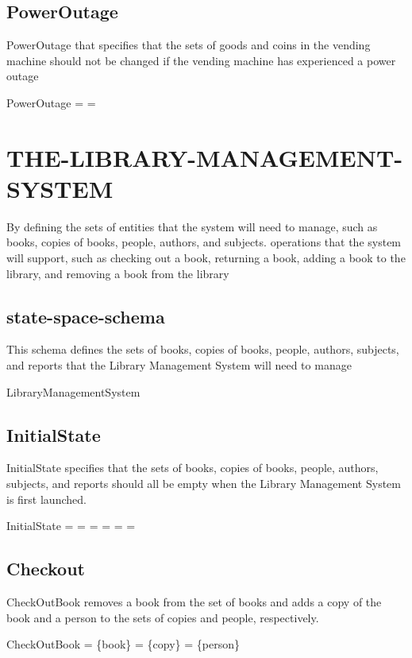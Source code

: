 \documentclass{article}
\begin{document}
\subsection{PowerOutage}
 PowerOutage that specifies that the sets of goods and coins in the vending machine should not be changed if the vending machine has experienced a power outage
\begin{schema}{PowerOutage}
 = 
 = 
\end{schema}

\section{THE-LIBRARY-MANAGEMENT-SYSTEM}
By defining the sets of entities that the system will need to manage, such as books, copies of books, people, authors, and subjects. operations that the system will support, such as checking out a book, returning a book, adding a book to the library, and removing a book from the library

\subsection{state-space-schema}
This schema defines the sets of books, copies of books, people, authors, subjects, and reports that the Library Management System will need to manage
\begin{schema}{LibraryManagementSystem}
\end{schema}

\subsection{InitialState}
InitialState specifies that the sets of books, copies of books, people, authors, subjects, and reports should all be empty when the Library Management System is first launched.
\begin{schema}{InitialState}
 = \emptyset
{} = \emptyset
{} = \emptyset
{} = \emptyset
{} = \emptyset
{} = \emptyset
\end{schema}


\subsection{Checkout}
CheckOutBook removes a book from the set of books and adds a copy of the book and a person to the sets of copies and people, respectively.
\begin{schema}{CheckOutBook}
 =  \setminus \{book\}
 =  \cup \{copy\}
 =  \cup \{person\}
\end{schema}
\end{document}
